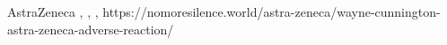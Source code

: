           {}
          {}
          {AstraZeneca}
          {}
          {
            ,
            ,
            ,
          }
          {https://nomoresilence.world/astra-zeneca/wayne-cunnington-astra-zeneca-adverse-reaction/}

